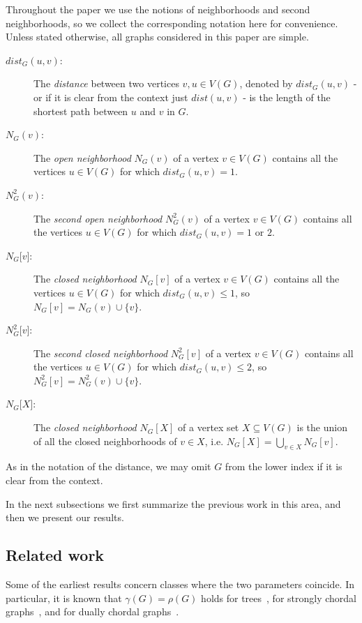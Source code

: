 \documentclass[a4paper, 12pt]{article}
\begin{document}
Throughout the paper we use the notions of neighborhoods and second neighborhoods, so we collect the corresponding notation here for convenience. Unless stated otherwise, all graphs considered in this paper are simple.

\begin{description}
    \item[$dist_G(u,v)$:] The {\it distance} between two vertices $v,u\in V(G)$, denoted by $dist_G(u,v)$ - or if it is clear from the context just $dist(u,v)$ - is the length of the shortest path between $u$ and $v$ in $G$. 
    \item[$N_G(v)$:] The {\it open neighborhood} $N_G(v)$ of a vertex $v \in V(G)$ contains all the vertices $u \in V(G)$ for which $dist_G(u,v)=1$.
    \item[$N_G^2(v)$:] The {\it second open neighborhood} $N^2_G(v)$ of a vertex $v \in V(G)$ contains all the vertices $u \in V(G)$ for which $dist_G(u,v)=1 \text{ or }2$.
    \item[$N_G\text{[}v\text{]}$:] The {\it closed neighborhood} $N_G[v]$ of a vertex $v \in V(G)$ contains all the vertices $u \in V(G)$ for which $dist_G(u,v)\leq1$, so $N_G[v] = N_G(v) \cup \{v\}$.
    \item[$N_G^2\text{[}v\text{]}$:] The {\it second closed neighborhood} $N^2_G[v]$ of a vertex $v \in V(G)$ contains all the vertices $u \in V(G)$ for which $dist_G(u,v)\leq2$, so $N^2_G[v] = N^2_G(v) \cup \{v\}$.
    \item[$N_G\text{[}X\text{]}$:] The {\it closed neighborhood} $N_G[X]$ of a vertex set $X \subseteq V(G)$ is the union of all the closed neighborhoods of $v \in X$, i.e. $N_G[X] = \bigcup_{v\in X}N_G[v]$. 
\end{description}
As in the notation of the distance, we may omit $G$ from the lower index if it is clear from the context.

In the next subsections we first summarize the previous work in this area, and then we present our results.

\subsection{Related work}
Some of the earliest results concern classes where the two parameters coincide. In particular, it is known that $\gamma(G)=\rho(G)$ holds for trees~\cite{MeirMoon75}, for strongly chordal graphs~\cite{Farber84}, and for dually chordal graphs~\cite{Brandstadt98}.
\end{document}

